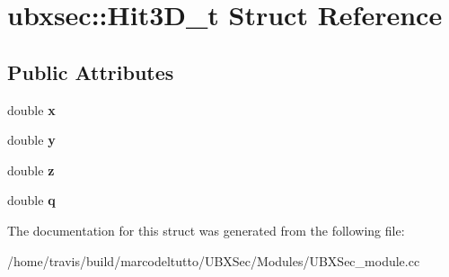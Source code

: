 \hypertarget{structubxsec_1_1Hit3D__t}{\section{ubxsec\-:\-:\-Hit3\-D\-\_\-t \-Struct \-Reference}
\label{structubxsec_1_1Hit3D__t}
}
\subsection*{\-Public \-Attributes}
\begin{DoxyCompactItemize}
\item 
\hypertarget{structubxsec_1_1Hit3D__t_ab4929fe0026546ff06fdf001ecfa5b33}{double {\bfseries x}}\label{structubxsec_1_1Hit3D__t_ab4929fe0026546ff06fdf001ecfa5b33}

\item 
\hypertarget{structubxsec_1_1Hit3D__t_ab5462982ffba0961cd4aa3399efac368}{double {\bfseries y}}\label{structubxsec_1_1Hit3D__t_ab5462982ffba0961cd4aa3399efac368}

\item 
\hypertarget{structubxsec_1_1Hit3D__t_a109099e70c1e956e35cf6d4ecab9ef02}{double {\bfseries z}}\label{structubxsec_1_1Hit3D__t_a109099e70c1e956e35cf6d4ecab9ef02}

\item 
\hypertarget{structubxsec_1_1Hit3D__t_a205dc1ee3dba776b70d58809fdc481aa}{double {\bfseries q}}\label{structubxsec_1_1Hit3D__t_a205dc1ee3dba776b70d58809fdc481aa}

\end{DoxyCompactItemize}


\-The documentation for this struct was generated from the following file\-:\begin{DoxyCompactItemize}
\item 
/home/travis/build/marcodeltutto/\-U\-B\-X\-Sec/\-Modules/\-U\-B\-X\-Sec\-\_\-module.\-cc\end{DoxyCompactItemize}
